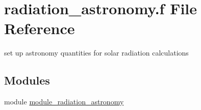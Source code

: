 \hypertarget{radiation__astronomy_8f}{}\section{radiation\+\_\+astronomy.\+f File Reference}
\label{radiation__astronomy_8f}


set up astronomy quantities for solar radiation calculations  


\subsection*{Modules}
\begin{DoxyCompactItemize}
\item 
module \hyperlink{namespacemodule__radiation__astronomy}{module\+\_\+radiation\+\_\+astronomy}
\end{DoxyCompactItemize}
